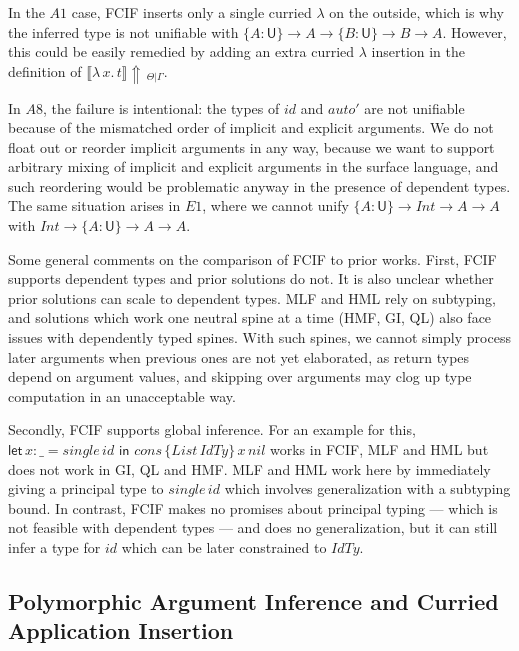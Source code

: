 \documentclass[acmsmall,screen,dvipsnames]{acmart}\settopmatter{}
\newcommand{\slet}{\boldsymbol{\mathsf{let}}}
\renewcommand{\sin}{\boldsymbol{\mathsf{in}}}
\renewcommand{\U}{\mathsf{U}}
\newcommand{\mi}[1]{\mathit{#1}}
\newcommand{\einfer}[3]{\llbracket#1\rrbracket\!\Uparrow\,_{#2|#3}}
\theoremstyle{remark}
\begin{document}
In the $A1$ case, FCIF inserts only a single curried $\lambda$ on the outside,
which is why the inferred type is not unifiable with $\{A : \U\}\to A \to \{B :
\U\} \to B \to A$. However, this could be easily remedied by adding an extra
curried $\lambda$ insertion in the definition of
$\einfer{\lambda\,x.\,t}{\Theta}{\Gamma}$.

In $A8$, the failure is intentional: the types of $id$ and $auto'$ are not
unifiable because of the mismatched order of implicit and explicit arguments. We
do not float out or reorder implicit arguments in any way, because we want to
support arbitrary mixing of implicit and explicit arguments in the surface
language, and such reordering would be problematic anyway in the presence of
dependent types. The same situation arises in $E1$, where we cannot unify $\{A :
\U\}\to \mi{Int} \to A \to A$ with $\mi{Int} \to \{A : \U\}\to A \to A$.

Some general comments on the comparison of FCIF to prior works. First, FCIF
supports dependent types and prior solutions do not. It is also unclear whether
prior solutions can scale to dependent types. MLF and HML rely on subtyping, and
solutions which work one neutral spine at a time (HMF, GI, QL) also face issues
with dependently typed spines. With such spines, we cannot simply process later
arguments when previous ones are not yet elaborated, as return types depend on
argument values, and skipping over arguments may clog up type computation in an
unacceptable way.

Secondly, FCIF supports global inference. For an example for this, $\slet\,x :
\_ = \mi{single}\,\mi{id}\,\,\sin$ $\mi{cons}\,\{\mi{List}\,\mi{IdTy}\}\,x\,\mi{nil}$ works
in FCIF, MLF and HML but does not work in GI, QL and HMF. MLF and HML work here
by immediately giving a principal type to $\mi{single}\,\mi{id}$ which involves
generalization with a subtyping bound. In contrast, FCIF makes no promises about
principal typing --- which is not feasible with dependent types --- and does no
generalization, but it can still infer a type for $\mi{id}$ which can be later
constrained to $\mi{IdTy}$.

\subsection{Polymorphic Argument Inference and Curried Application Insertion}
\label{sec:appinsert}
\end{document}
